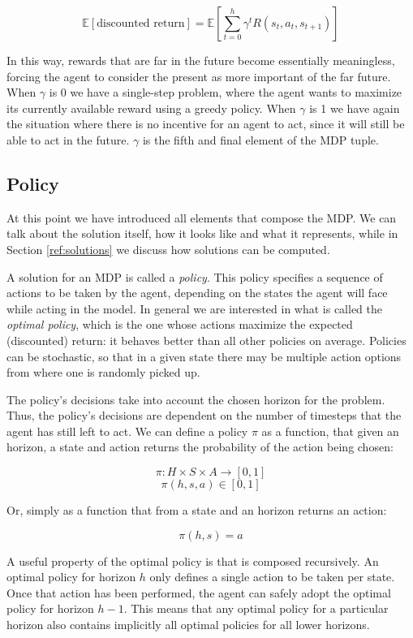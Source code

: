 \[ \mathbb{E}[\text{discounted return}] = \mathbb{E} \left [ \sum_{t=0}^h \gamma^t R(s_t,
a_t, s_{t+1}) \right ] \]

In this way, rewards that are far in the future become essentially meaningless, forcing the agent to
consider the present as more important of the far future. When $\gamma$ is 0 we have a single-step
problem, where the agent wants to maximize its currently available reward using a greedy policy.
When $\gamma$ is 1 we have again the situation where there is no incentive for an agent to act,
since it will still be able to act in the future. $\gamma$ is the fifth and final element of the MDP
tuple.

\subsection{Policy}

At this point we have introduced all elements that compose the MDP. We can talk about the solution
itself, how it looks like and what it represents, while in Section \ref{ref:solutions} we discuss
how solutions can be computed.

A solution for an MDP is called a \textit{policy}. This policy specifies a sequence of actions to
be taken by the agent, depending on the states the agent will face while acting in the model. In
general we are interested in what is called the \textit{optimal policy}, which is the one whose
actions maximize the expected (discounted) return: it behaves better than all other policies on
average. Policies can be stochastic, so that in a given state there may be multiple action options
from where one is randomly picked up.

The policy's decisions take into account the chosen horizon for the problem. Thus, the policy's
decisions are dependent on the number of timesteps that the agent has still left to act. We can
define a policy $\pi$ as a function, that given an horizon, a state and action returns the
probability of the action being chosen:

\[ \pi : H \times S \times A \rightarrow [0,1] \]
\[ \pi(h, s, a) \in [0,1] \]

Or, simply as a function that from a state and an horizon returns an action:

\[ \pi(h, s) = a \]

A useful property of the optimal policy is that is composed recursively. An optimal policy for
horizon $h$ only defines a single action to be taken per state. Once that action has been performed,
the agent can safely adopt the optimal policy for horizon $h-1$. This means that any optimal policy
for a particular horizon also contains implicitly all optimal policies for all lower horizons.


